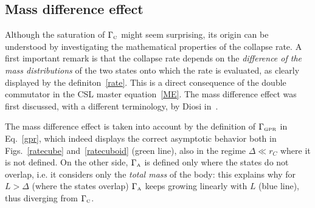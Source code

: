 \documentclass[11pt,onecolumn,amssymb,nofootinbib]{revtex4}
\begin{document}
\subsection{Mass difference effect}
Although the saturation of $\Gamma_\text{\tiny{C}}$ might seem surprising, its origin can be understood by investigating the mathematical properties of the collapse rate. A first important remark is that the collapse rate depends on the \emph{difference of the mass distributions} of the two states onto which the rate is evaluated, as clearly displayed by the definiton~\eqref{rate}. This is a direct consequence of the double commutator in the CSL master equation~\eqref{ME}. The mass difference effect was first discussed, with a different terminology, by Diosi in~\cite{Dio19}.

The mass difference effect is taken into account by the definition of $\Gamma_\text{\tiny{GPR}}$ in Eq.~\eqref{gpr}, which indeed displays the correct asymptotic behavior both in Figs.~\ref{ratecube} and~\ref{ratecuboid} (green line), also in the regime $\Delta\ll r_C$ where it is not defined. On the other side, $\Gamma_\text{\tiny{A}}$ is defined only where the states do not overlap, i.e. it considers only the \emph{total mass} of the body: this explains why for $L>\Delta$ (where the states overlap) $\Gamma_\text{\tiny{A}}$ keeps growing linearly with $L$ (blue line), thus diverging from $\Gamma_\text{\tiny{C}}$.
\end{document}

